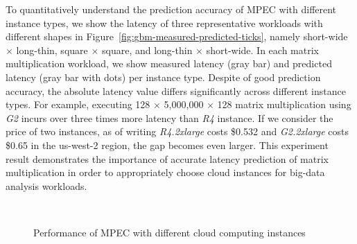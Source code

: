 \documentclass[10pt, conference, compsocconf]{IEEEtran}
\begin{document}
To quantitatively understand the prediction accuracy of MPEC with different instance types, we show the latency of three representative workloads with different shapes in Figure~\ref{fig:gbm-measured-predicted-ticks}, namely short-wide $\times$ long-thin, square $\times$ square, and long-thin $\times$ short-wide. In each matrix multiplication workload, we show measured latency (gray bar) and predicted latency (gray bar with dots) per instance type. Despite of good prediction accuracy, the absolute latency value differs significantly across different instance types. For example, executing 128 $\times$ 5,000,000 $\times$ 128 matrix multiplication using \textit{G2} incurs over three times more latency than \textit{R4} instance. If we consider the price of two instances, as of writing \textit{R4.2xlarge} costs \$0.532 and \textit{G2.2xlarge} costs \$0.65 in the us-west-2 region, the gap becomes even larger. This experiment result demonstrates the importance of accurate latency prediction of matrix multiplication in order to appropriately choose cloud instances for big-data analysis workloads.

\begin{figure}[t]
	\centering
	\\
	 \hfil
	\caption{\label{fig:gbm-comparison}Performance of MPEC with different cloud computing instances}
\end{figure}
\end{document}
